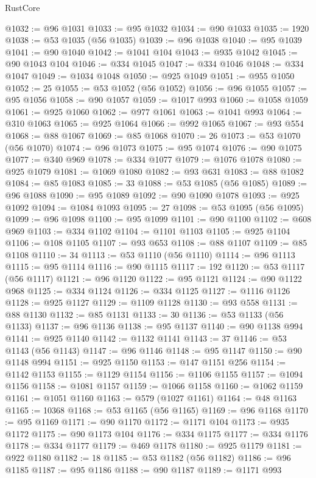 \begin{lexlean}{RustCore}
\begin{coremodule}
@1032 := @96 @1031
@1033 := @95 @1032
@1034 := @90 @1033
@1035 := 1920
@1038 := @53 @1035 (@56 @1035)
@1039 := @96 @1038
@1040 := @95 @1039
@1041 := @90 @1040
@1042 := @1041 @104
@1043 := @935 @1042
@1045 := @90 @1043 @104
@1046 := @334 @1045
@1047 := @334 @1046
@1048 := @334 @1047
@1049 := @1034 @1048
@1050 := @925 @1049
@1051 := @955 @1050
@1052 := 25
@1055 := @53 @1052 (@56 @1052)
@1056 := @96 @1055
@1057 := @95 @1056
@1058 := @90 @1057
@1059 := @1017 @993
@1060 := @1058 @1059
@1061 := @925 @1060
@1062 := @977 @1061
@1063 := @1041 @993
@1064 := @310 @1063
@1065 := @925 @1064
@1066 := @992 @1065
@1067 := @93 @554
@1068 := @88 @1067
@1069 := @85 @1068
@1070 := 26
@1073 := @53 @1070 (@56 @1070)
@1074 := @96 @1073
@1075 := @95 @1074
@1076 := @90 @1075
@1077 := @340 @969
@1078 := @334 @1077
@1079 := @1076 @1078
@1080 := @925 @1079
@1081 := @1069 @1080
@1082 := @93 @631
@1083 := @88 @1082
@1084 := @85 @1083
@1085 := 33
@1088 := @53 @1085 (@56 @1085)
@1089 := @96 @1088
@1090 := @95 @1089
@1092 := @90 @1090 @1078
@1093 := @925 @1092
@1094 := @1084 @1093
@1095 := 27
@1098 := @53 @1095 (@56 @1095)
@1099 := @96 @1098
@1100 := @95 @1099
@1101 := @90 @1100
@1102 := @608 @969
@1103 := @334 @1102
@1104 := @1101 @1103
@1105 := @925 @1104
@1106 := @108 @1105
@1107 := @93 @653
@1108 := @88 @1107
@1109 := @85 @1108
@1110 := 34
@1113 := @53 @1110 (@56 @1110)
@1114 := @96 @1113
@1115 := @95 @1114
@1116 := @90 @1115
@1117 := 192
@1120 := @53 @1117 (@56 @1117)
@1121 := @96 @1120
@1122 := @95 @1121
@1124 := @90 @1122 @968
@1125 := @334 @1124
@1126 := @334 @1125
@1127 := @1116 @1126
@1128 := @925 @1127
@1129 := @1109 @1128
@1130 := @93 @558
@1131 := @88 @1130
@1132 := @85 @1131
@1133 := 30
@1136 := @53 @1133 (@56 @1133)
@1137 := @96 @1136
@1138 := @95 @1137
@1140 := @90 @1138 @994
@1141 := @925 @1140
@1142 := @1132 @1141
@1143 := 37
@1146 := @53 @1143 (@56 @1143)
@1147 := @96 @1146
@1148 := @95 @1147
@1150 := @90 @1148 @994
@1151 := @925 @1150
@1153 := @147 @1151 @256
@1154 := @1142 @1153
@1155 := @1129 @1154
@1156 := @1106 @1155
@1157 := @1094 @1156
@1158 := @1081 @1157
@1159 := @1066 @1158
@1160 := @1062 @1159
@1161 := @1051 @1160
@1163 := @579 (@1027 @1161)
@1164 := @48 @1163
@1165 := 10368
@1168 := @53 @1165 (@56 @1165)
@1169 := @96 @1168
@1170 := @95 @1169
@1171 := @90 @1170
@1172 := @1171 @104
@1173 := @935 @1172
@1175 := @90 @1173 @104
@1176 := @334 @1175
@1177 := @334 @1176
@1178 := @334 @1177
@1179 := @469 @1178
@1180 := @925 @1179
@1181 := @922 @1180
@1182 := 18
@1185 := @53 @1182 (@56 @1182)
@1186 := @96 @1185
@1187 := @95 @1186
@1188 := @90 @1187
@1189 := @1171 @993

\end{coremodule}
\end{lexlean}
